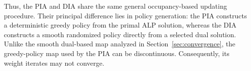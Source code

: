 \documentclass[sglanonrev]{informs4}
\providecommand{\bI}{\boldsymbol{I}}
\providecommand{\bPhi}{\boldsymbol{\Phi}}
\providecommand{\bc}{\boldsymbol{c}}
\providecommand{\bnu}{\boldsymbol{\nu}}
\providecommand{\br}{\boldsymbol{r}}
\begin{document}
\begin{APPENDICES}
Thus, the \ac{PIA} and \ac{DIA} share the same general occupancy-based updating procedure. Their principal difference lies in policy generation: the \ac{PIA} constructs a deterministic greedy policy from the primal \ac{ALP} solution, whereas the \ac{DIA} constructs a smooth randomized policy directly from a selected dual solution. Unlike the smooth dual-based map analyzed in Section~\ref{sec:convergence}, the greedy-policy map used by the \ac{PIA} can be discontinuous.
Consequently, its weight iterates may not converge.

\end{APPENDICES}
\end{document}
